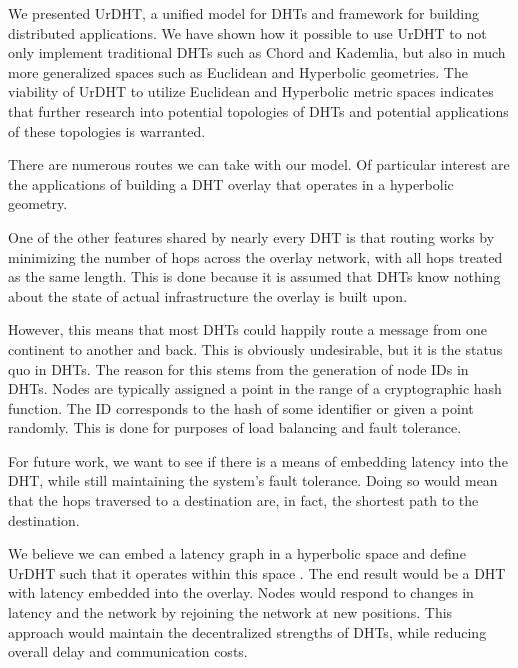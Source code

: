 We presented UrDHT, a unified model for DHTs and framework for building distributed applications.
We have shown how it possible to use UrDHT to not only implement traditional DHTs such as Chord and Kademlia, but also in much more generalized spaces such as Euclidean and Hyperbolic geometries.
The viability of UrDHT to utilize Euclidean and Hyperbolic metric spaces indicates that further research into potential topologies of DHTs and potential applications of these topologies is warranted.



There are numerous routes we can take with our model.
Of particular interest are the applications of building a DHT overlay that operates in a hyperbolic geometry.

One of the other features shared by nearly every DHT is that routing works by minimizing the number of hops across the overlay network, with all hops treated as the same length.
This is done because it is assumed that DHTs know nothing about the state of actual infrastructure the overlay is built upon.

However, this means that most DHTs could happily route a message from one continent to another and back.
This is obviously undesirable, but it is the status quo in DHTs.
The reason for this stems from the generation of node IDs in DHTs. 
Nodes are typically assigned a point in the range of a cryptographic hash function. 
The ID corresponds to the hash of some identifier or given a point randomly.
This is done for purposes of load balancing and fault tolerance.

For future work, we want to see if there is a means of embedding latency into the DHT, while still maintaining the system's fault tolerance.
Doing so would mean that the hops traversed to a destination are, in fact, the shortest path to the destination.

We believe we can embed a latency graph in a hyperbolic space and define UrDHT such that it operates within this space \cite{kleinberg2007geographic} \cite{cvetkovski2009hyperbolic}.
The end result would be a DHT with latency embedded into the overlay.
Nodes would respond to changes in latency and the network by rejoining the network at new positions.
This approach would maintain the decentralized strengths of DHTs, while reducing overall delay and communication costs.




%
%
